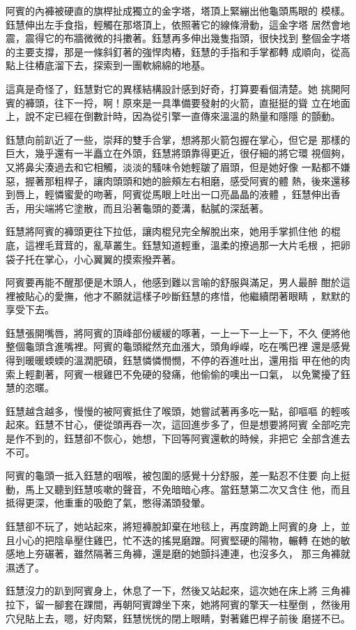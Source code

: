 阿賓的內褲被硬直的旗桿扯成獨立的金字塔，塔頂上緊繃出他龜頭馬眼的
模樣。鈺慧伸出左手食指，輕觸在那塔頂上，依照著它的線條滑動，這金字塔
居然會地震，震得它的布牆微微的抖擻著。鈺慧再多伸出幾隻指頭，很快找到
整個金字塔的主要支撐，那是一條斜釘著的強悍肉樁，鈺慧的手指和手掌都轉
成順向，從高點上往樁底溜下去，探索到一團軟綿綿的地基。

這真是奇怪了，鈺慧對它的異樣結構設計感到好奇，打算要看個清楚。她
挑開阿賓的褲頭，往下一捋，啊！原來是一具準備要發射的火箭，直挺挺的聳
立在地面上，說不定已經在倒數計時，因為從引擎一直傳來溫溫的熱量和隱隱
的顫動。

鈺慧向前趴近了一些，崇拜的雙手合掌，想將那火箭包握在掌心，但它是
那樣的巨大，幾乎還有一半矗立在外頭，鈺慧將頭靠得更近，很仔細的將它環
視個夠，又將鼻尖湊過去和它相觸，淡淡的騷味令她輕皺了眉頭，但是她好像
一點都不嫌惡，握著那粗桿子，讓肉頭頭和她的臉頰左右相磨，感受阿賓的體
熱，後來還移到唇上，輕憐蜜愛的吻著，阿賓從馬眼上吐出一口亮晶晶的液體
，鈺慧伸出香舌，用尖端將它塗散，而且沿著龜頭的菱溝，黏膩的深舐著。

鈺慧將阿賓的褲頭更往下拉低，讓肉棍兒完全解脫出來，她用手掌抓住他
的棍底，這裡毛茸茸的，亂草叢生。鈺慧知道輕重，溫柔的撩過那一大片毛根
，把卵袋子托在掌心，小心翼翼的摸索撥弄著。

阿賓要再能不醒那便是木頭人，他感到難以言喻的舒服與滿足，男人最醉
酣於這裡被貼心的愛撫，他才不願就這樣子吵斷鈺慧的疼惜，他繼續閉著眼睛
，默默的享受下去。

鈺慧張開嘴唇，將阿賓的頂峰部份緩緩的啄著，一上一下一上一下，不久
便將他整個龜頭含進嘴裡。阿賓的龜頭縱然充血漲大，頭角崢嶸，吃在嘴巴裡
還是感覺得到暖暖蝡蝡的溫潤肥碩，鈺慧憐憐憫憫，不停的吞進吐出，還用指
甲在他的肉索上輕劃著，阿賓一根雞巴不免硬的發痛，他偷偷的噢出一口氣，
以免驚擾了鈺慧的恣暱。

鈺慧越含越多，慢慢的被阿賓抵住了喉頭，她嘗試著再多吃一點，卻嘔嘔
的輕咳起來。鈺慧不甘心，便從頭再吞一次，這回進步多了，但是想要將阿賓
全部吃完是作不到的，鈺慧卻不恢心，她想，下回等阿賓還軟的時候，非把它
全部含進去不可。

阿賓的龜頭一抵入鈺慧的咽喉，被包圍的感覺十分舒服，差一點忍不住要
向上挺動，馬上又聽到鈺慧咳嗽的聲音，不免暗暗心疼。當鈺慧第二次又含住
他，而且抵得更深，他重重的吸飽了氣，憋得滿頭發暈。

鈺慧卻不玩了，她站起來，將短褲脫卸棄在地毯上，再度跨跪上阿賓的身
上，並且小心的把陰阜壓住雞巴，忙不迭的搖晃磨蹭。阿賓堅硬的陽物，輾轉
在她的敏感地上夯碾著，雖然隔著三角褲，還是磨的她顫抖連連，也沒多久，
那三角褲就濕透了。

鈺慧沒力的趴到阿賓身上，休息了一下，然後又站起來，這次她在床上將
三角褲拉下，留一腳套在踝間，再朝阿賓蹲坐下來，她將阿賓的擎天一柱壓倒
，然後用穴兒貼上去，嗯，好肉緊，鈺慧恍恍的閉上眼睛，對著雞巴桿子前後
磨搓不已。


